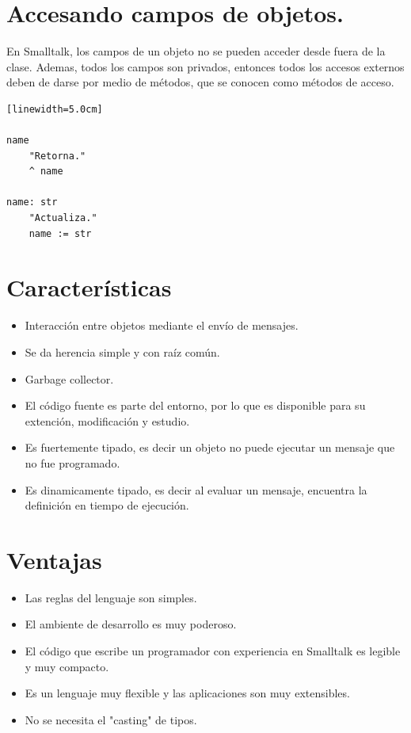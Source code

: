 \documentclass[10pt,journal,compsoc]{IEEEtran}
\begin{document}
\section{Accesando campos de objetos.}
En Smalltalk, los campos de un objeto no se pueden acceder desde fuera de la clase. Ademas, todos los campos son privados, entonces todos los accesos externos deben de darse por medio de m\'etodos, que se conocen como m\'etodos de acceso.
\begin{lstlisting}[caption = {Ejemplo de m\'etodo de acceso al campo "name" de una clase.}][linewidth=5.0cm]

name
	"Retorna."
	^ name

name: str
	"Actualiza."
	name := str

\end{lstlisting}

\section{Caracter\'isticas}
\begin{itemize}
	\item Interacci\'on entre objetos mediante el env\'io de mensajes.
	\item Se da herencia simple y con ra\'iz com\'un.
	\item Garbage collector.
	\item El c\'odigo fuente es parte del entorno, por lo que es disponible para su extenci\'on, modificaci\'on y estudio.
	\item Es fuertemente tipado, es decir un objeto no puede ejecutar un mensaje que no fue programado.
	\item Es dinamicamente tipado, es decir al evaluar un mensaje, encuentra la definici\'on en tiempo de ejecuci\'on.
\end{itemize}

\section{Ventajas}
\begin{itemize}
	\item Las reglas del lenguaje son simples.
	\item El ambiente de desarrollo es muy poderoso.
	\item El c\'odigo que escribe un programador con experiencia en Smalltalk es legible y muy compacto.
	\item Es un lenguaje muy flexible y las aplicaciones son muy extensibles.
	\item No se necesita el "casting" de tipos.
\end{itemize}
\end{document}
